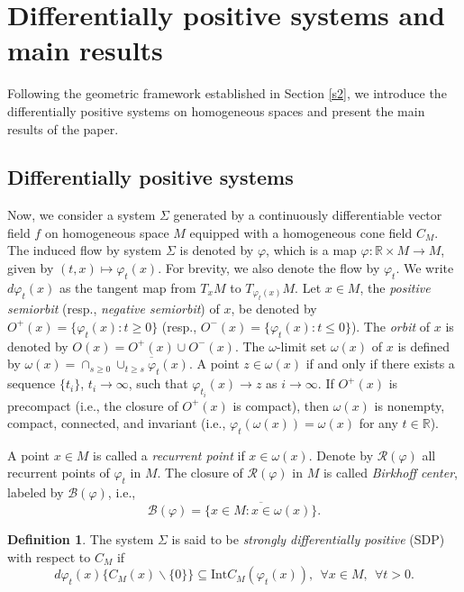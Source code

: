 \documentclass[a4paper,11pt]{article}
\theoremstyle{plain}
\theoremstyle{definition}
\newtheorem{defn}[thm]{Definition}
\numberwithin{equation}{section}
\begin{document}
\section{Differentially positive systems and main results}\label{DP}


Following the geometric framework established in Section \ref{s2}, we introduce the differentially positive systems on homogeneous spaces and present the main results of the paper.

\subsection{Differentially positive systems}\label{SDP}

Now, we consider a system $\Sigma$ generated by a continuously differentiable vector field $f$ on homogeneous space $M$ equipped with a homogeneous cone field $C_M$. The induced flow by system $\Sigma$ is denoted by $\varphi$, which is a map $\varphi \colon \mathbb{R} \times M \to M$, given by $(t, x) \mapsto \varphi_t(x)$. For brevity, we also denote the flow by $\varphi_t$. We write $d\varphi_t(x)$ as the tangent map from $T_{x}M$ to $T_{\varphi_{t}(x)}M$. Let $x\in M$, the \textit{positive semiorbit} (resp., \textit{negative semiorbit}) of $x$, be denoted by $O^+(x)=\{\varphi_t(x) \colon t\geq 0\}$ (resp.,  $O^-(x)=\{\varphi_t(x)\colon t\leq 0\}$). The \textit{orbit} of $x$ is denoted by $O(x)=O^+(x)\cup O^-(x)$. The $\omega$-limit set $\omega(x)$ of $x$ is defined by $\omega(x)=\cap_{s\geq 0}\overline{\cup_{t\geq s}\varphi_t(x)}$. A point $z\in \omega(x)$ if and only if there exists a sequence $\{t_i\}$, $t_i\to \infty$, such that $\varphi_{t_i}(x)\to z$ as $i\to \infty$. If $O^+(x)$ is precompact (i.e., the closure of $O^{+}(x)$ is compact), then $\omega(x)$ is nonempty, compact, connected, and invariant (i.e., $\varphi_t(\omega(x))=\omega(x)$ for any $t\in \mathbb{R}$).


A point $x\in M$ is called a \textit{recurrent point} if $x\in \omega(x)$. Denote by $\mathcal{R}(\varphi)$ all recurrent points of $\varphi_t$ in $M$. The closure of $\mathcal{R}(\varphi)$ in $M$ is called \textit{Birkhoff center}, labeled by $\mathcal{B}(\varphi)$, i.e.,
\begin{equation*}
	\mathcal{B}(\varphi)=\overline{\{x\in M \colon x\in \omega(x)\}}.
\end{equation*}



\begin{defn}\label{differential positive}
	The system $\Sigma$ is said to be \textit{strongly differentially positive} (SDP) with respect to $C_{M}$ if
	\begin{equation*}
		d\varphi_t(x)\{ C_{M}(x)\backslash \{ 0\} \} \subseteq \text{Int} C_{M}(\varphi_t(x)), \ \ \forall x\in M, \ \ \forall t>0.
	\end{equation*}
\end{defn}
\end{document}
